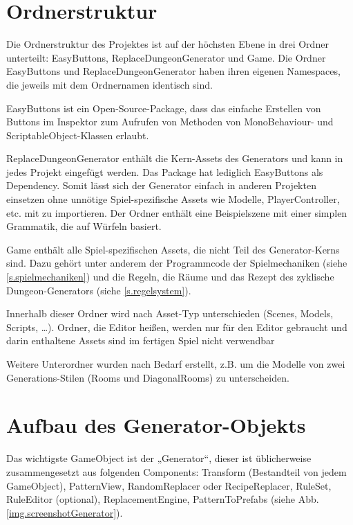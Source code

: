 \section{Ordnerstruktur}

Die Ordnerstruktur des Projektes ist auf der höchsten Ebene in drei Ordner unterteilt: EasyButtons, ReplaceDungeonGenerator und Game. Die Ordner EasyButtons und ReplaceDungeonGenerator haben ihren eigenen Namespaces, die jeweils mit dem Ordnernamen identisch sind.

EasyButtons ist ein Open-Source-Package, dass das einfache Erstellen von Buttons im Inspektor zum Aufrufen von Methoden von MonoBehaviour- und ScriptableObject-Klassen erlaubt. \cite{easyButtons}

ReplaceDungeonGenerator enthält die Kern-Assets des Generators und kann in jedes Projekt eingefügt werden. Das Package hat lediglich EasyButtons als Dependency. Somit lässt sich der Generator einfach in anderen Projekten einsetzen ohne unnötige Spiel-spezifische Assets wie Modelle, PlayerController, etc. mit zu importieren. Der Ordner enthält eine Beispielszene mit einer simplen Grammatik, die auf Würfeln basiert.

Game enthält alle Spiel-spezifischen Assets, die nicht Teil des Generator-Kerns sind. Dazu gehört unter anderem der Programmcode der Spielmechaniken (siehe \ref{s.spielmechaniken}) und die Regeln, die Räume und das Rezept des zyklische Dungeon-Generators (siehe \ref{s.regelsystem}).

Innerhalb dieser Ordner wird nach Asset-Typ unterschieden (Scenes, Models, Scripts, \dots). Ordner, die Editor heißen, werden nur für den Editor gebraucht und darin enthaltene Assets sind im fertigen Spiel nicht verwendbar \cite[Seite: SpecialFolders]{unityManual}

Weitere Unterordner wurden nach Bedarf erstellt, z.B. um die Modelle von zwei Generations-Stilen (Rooms und DiagonalRooms) zu unterscheiden.

\section{Aufbau des Generator-Objekts}

Das wichtigste GameObject ist der „Generator“, dieser ist üblicherweise zusammengesetzt aus folgenden Components: 
Transform (Bestandteil von jedem GameObject), PatternView, RandomReplacer oder RecipeReplacer, RuleSet, RuleEditor (optional), ReplacementEngine, PatternToPrefabs (siehe Abb. \ref{img.screenshotGenerator}). 


